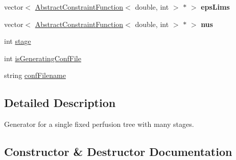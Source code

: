 \begin{DoxyCompactItemize}
\item 
vector$<$ \hyperlink{class_abstract_constraint_function}{Abstract\+Constraint\+Function}$<$ double, int $>$ $\ast$ $>$ {\bfseries eps\+Lims}\hypertarget{class_staged_f_r_r_o_tree_generator_a1267c3bf746b17812daf41cd7e89b7e6}{}\label{class_staged_f_r_r_o_tree_generator_a1267c3bf746b17812daf41cd7e89b7e6}

\item 
vector$<$ \hyperlink{class_abstract_constraint_function}{Abstract\+Constraint\+Function}$<$ double, int $>$ $\ast$ $>$ {\bfseries nus}\hypertarget{class_staged_f_r_r_o_tree_generator_a48c89ee980293fc8c5188bbfd8bcbb08}{}\label{class_staged_f_r_r_o_tree_generator_a48c89ee980293fc8c5188bbfd8bcbb08}

\item 
int \hyperlink{class_staged_f_r_r_o_tree_generator_a9410e8bb105a69fc8636e718e7ac9dfc}{stage}
\item 
int \hyperlink{class_staged_f_r_r_o_tree_generator_a0b79edc4a184c376ab11260603004932}{is\+Generating\+Conf\+File}
\item 
string \hyperlink{class_staged_f_r_r_o_tree_generator_a244b1c195aa8395242deeeadb3ecf657}{conf\+Filename}
\end{DoxyCompactItemize}


\subsection{Detailed Description}
Generator for a single fixed perfusion tree with many stages. 

\subsection{Constructor \& Destructor Documentation}
